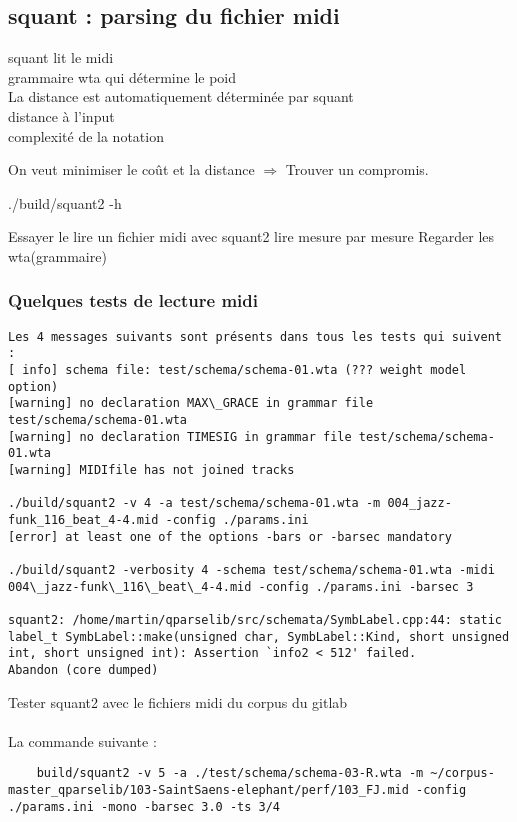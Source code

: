 \subsection{squant : parsing du fichier midi}
squant lit le midi\\
grammaire wta qui détermine le poid\\
La distance est automatiquement déterminée par squant\\
distance à l’input\\
complexité de la notation

On veut minimiser le coût et la distance $\Rightarrow$ Trouver un compromis.

./build/squant2 -h

Essayer le lire un fichier midi avec squant2
lire mesure par mesure
Regarder les wta(grammaire)

\subsubsection{Quelques tests de lecture midi}
\begin{verbatim}
Les 4 messages suivants sont présents dans tous les tests qui suivent :
[ info] schema file: test/schema/schema-01.wta (??? weight model option)
[warning] no declaration MAX\_GRACE in grammar file test/schema/schema-01.wta
[warning] no declaration TIMESIG in grammar file test/schema/schema-01.wta
[warning] MIDIfile has not joined tracks

./build/squant2 -v 4 -a test/schema/schema-01.wta -m 004_jazz-funk_116_beat_4-4.mid -config ./params.ini
[error] at least one of the options -bars or -barsec mandatory

./build/squant2 -verbosity 4 -schema test/schema/schema-01.wta -midi 004\_jazz-funk\_116\_beat\_4-4.mid -config ./params.ini -barsec 3

squant2: /home/martin/qparselib/src/schemata/SymbLabel.cpp:44: static label_t SymbLabel::make(unsigned char, SymbLabel::Kind, short unsigned int, short unsigned int): Assertion `info2 < 512' failed.
Abandon (core dumped)
\end{verbatim}

Tester squant2 avec le fichiers midi du corpus du gitlab\\\\

La commande suivante :
\begin{verbatim}
	build/squant2 -v 5 -a ./test/schema/schema-03-R.wta -m ~/corpus-master_qparselib/103-SaintSaens-elephant/perf/103_FJ.mid -config ./params.ini -mono -barsec 3.0 -ts 3/4	
\end{verbatim}

